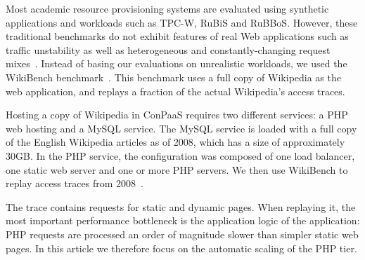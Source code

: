 

Most academic resource provisioning systems are evaluated using
synthetic applications and workloads such as TPC-W, RuBiS and
RuBBoS. However, these traditional benchmarks do not exhibit features
of real Web applications such as traffic unstability as well as
heterogeneous and constantly-changing request mixes~\cite{benchlab}.
Instead of basing our evaluations on unrealistic workloads, we used
the WikiBench benchmark~\cite{wikibench}. This benchmark uses a full
copy of Wikipedia as the web application, and replays a fraction of
the actual Wikipedia's access traces.


Hosting a copy of Wikipedia in ConPaaS requires two different
services: a PHP web hosting and a MySQL service. The MySQL service is
loaded with a full copy of the English Wikipedia articles as of 2008,
which has a size of approximately 30GB.  In the PHP service, the
configuration was composed of one load balancer, one static web server
and one or more PHP servers. We then use WikiBench to replay access
traces from 2008~\cite{urdaneta2009}.





The trace contains requests for static and dynamic pages. When
replaying it, the most important performance bottleneck is the
application logic of the application: PHP requests are processed an
order of magnitude slower than simpler static web pages. In this
article we therefore focus on the automatic scaling of the PHP tier.

